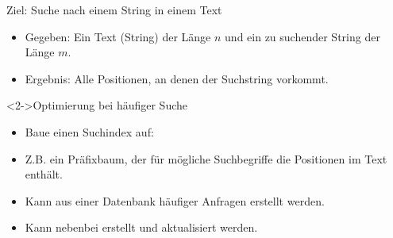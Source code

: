 \begin{frame}
    \begin{block}{Ziel: Suche nach einem String in einem Text}
        \begin{itemize}
            \item Gegeben: Ein Text (String) der Länge $n$ und ein zu suchender String der Länge $m$.
            \item Ergebnis: Alle Positionen, an denen der Suchstring vorkommt.
        \end{itemize}
    \end{block}
    \begin{block}<2->{Optimierung bei häufiger Suche}
        \begin{itemize}
            \item Baue einen \alert{Suchindex} auf:
            \item Z.B. ein Präfixbaum, der für mögliche Suchbegriffe die Positionen im Text enthält.
            \item Kann aus einer Datenbank häufiger Anfragen erstellt werden.
            \item Kann nebenbei erstellt und aktualisiert werden.
        \end{itemize}
    \end{block}
\end{frame}
